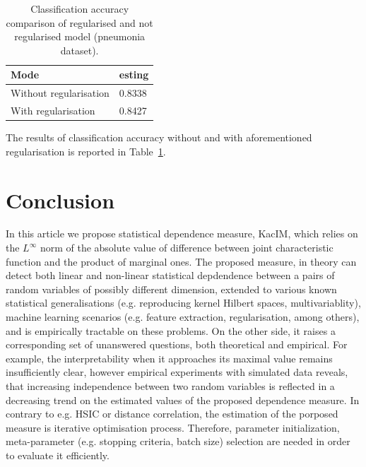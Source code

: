 \documentclass{article}
\begin{document}
\begin{table}	
	\centering
	\begin{tabular}{ |p{4cm}|p{2cm}|}
		\hline
		Mode & esting  \\
		\hline
		Without regularisation   &    0.8338 \\		
		\hline
		With regularisation  &   0.8427 \\		
		\hline
	\end{tabular}
	\caption{Classification accuracy comparison of regularised and not regularised model (pneumonia dataset).  }
	\label{table:regularisation_classification_accuracies}	
\end{table}

The results of classification accuracy without and with aforementioned regularisation is reported in Table~\ref{table:regularisation_classification_accuracies}.

\section{Conclusion} 

\label{section:conclusion}
In this article we propose statistical dependence measure, KacIM, which relies on the $L^{\infty}$ norm of the absolute value of difference between joint characteristic function and the product of marginal ones. The proposed measure, in theory can detect both linear and non-linear statistical depdendence between a pairs of random variables of possibly different dimension, extended to various known statistical generalisations (e.g. reproducing kernel Hilbert spaces, multivariablity), machine learning scenarios (e.g. feature extraction, regularisation, among others), and is empirically tractable on these problems. On the other side, it raises a corresponding set of unanswered questions, both theoretical and empirical. For example, the interpretability when it approaches its maximal value remains insufficiently clear, however empirical experiments with simulated data reveals, that increasing independence between two random variables is reflected in a decreasing trend on the estimated values of the proposed dependence measure. In contrary to e.g. HSIC or distance correlation, the estimation of the porposed measure is iterative optimisation process. Therefore, parameter initialization, meta-parameter (e.g. stopping criteria, batch size) selection are needed in order to evaluate it efficiently.
\end{document}
